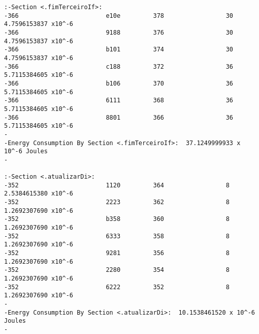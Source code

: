 \begin{verbatim}
:-Section <.fimTerceiroIf>:  
-366                        e10e         378                 30              4.7596153837 x10^-6 
-366                        9188         376                 30              4.7596153837 x10^-6 
-366                        b101         374                 30              4.7596153837 x10^-6 
-366                        c188         372                 36              5.7115384605 x10^-6 
-366                        b106         370                 36              5.7115384605 x10^-6 
-366                        6111         368                 36              5.7115384605 x10^-6 
-366                        8801         366                 36              5.7115384605 x10^-6 
-                                                                                          
-Energy Consumption By Section <.fimTerceiroIf>:  37.1249999933 x 10^-6 Joules
-                                                                                          

:-Section <.atualizarDi>:  
-352                        1120         364                 8              2.5384615380 x10^-6 
-352                        2223         362                 8              1.2692307690 x10^-6 
-352                        b358         360                 8              1.2692307690 x10^-6 
-352                        6333         358                 8              1.2692307690 x10^-6 
-352                        9281         356                 8              1.2692307690 x10^-6 
-352                        2280         354                 8              1.2692307690 x10^-6 
-352                        6222         352                 8              1.2692307690 x10^-6 
-                                                                                          
-Energy Consumption By Section <.atualizarDi>:  10.1538461520 x 10^-6 Joules
-                                                                                          


\end{verbatim}

